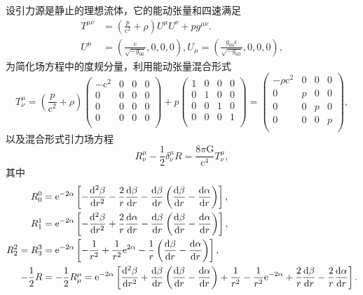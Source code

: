 \documentclass[11pt, a4paper, oneside, onecolumn]{ctexart}
\numberwithin{equation}{subsection}
\begin{document}
设引力源是静止的理想流体，它的能动张量和四速满足
\begin{align}
T^{\mu\nu}&=\left(\frac{p}{\mathrm{c}^{2}}+\rho\right)U^{\mu}U^{\nu}+pg^{\mu\nu}.\\
U^{\mu}&=\left(\frac{\mathrm{c}}{\sqrt{-g_{00}}},0,0,0\right),U_{\mu}=\left(\frac{g_{00}\mathrm{c}}{\sqrt{-g_{00}}},0,0,0\right),
\end{align}
为简化场方程中的度规分量，利用能动张量混合形式
\begin{equation}
T^{\mu}_{\nu}=\left(\frac{p}{\mathrm{c}^{2}}+\rho\right)
\begin{pmatrix}
-\mathrm{c}^{2} & 0 & 0 & 0\\
0 & 0 & 0 & 0\\
0 & 0 & 0 & 0\\
0 & 0 & 0 & 0\\
\end{pmatrix}
+p\begin{pmatrix}
1 & 0 & 0 & 0\\
0 & 1 & 0 & 0\\
0 & 0 & 1 & 0\\
0 & 0 & 0 & 1\\
\end{pmatrix}
=\begin{pmatrix}
-\rho \mathrm{c}^{2} & 0 & 0 & 0\\
0 & p & 0 & 0\\
0 & 0 & p & 0\\
0 & 0 & 0 & p\\
\end{pmatrix},
\end{equation}
以及混合形式引力场方程
\begin{equation}
R^{\mu}_{\nu}-\frac{1}{2}\delta{}^{\mu}_{\nu}R=\frac{8\pi\mathrm{G}}{\mathrm{c}^{4}}T^{\mu}_{\nu},
\end{equation}
其中
\begin{align}
R^{0}_{0}&=\mathrm{e}^{-2\alpha}\left[-\frac{\mathrm{d}^{2}\beta}{\mathrm{d}r^{2}}-\frac{2}{r}\frac{\mathrm{d}\beta}{\mathrm{d}r}-\frac{\mathrm{d}\beta}{\mathrm{d}r}\left(\frac{\mathrm{d}\beta}{\mathrm{d}r}-\frac{\mathrm{d}\alpha}{\mathrm{d}r}\right)\right],\notag\\
R^{1}_{1}&=\mathrm{e}^{-2\alpha}\left[-\frac{\mathrm{d}^{2}\beta}{\mathrm{d}r^{2}}+\frac{2}{r}\frac{\mathrm{d}\alpha}{\mathrm{d}r}-\frac{\mathrm{d}\beta}{\mathrm{d}r}\left(\frac{\mathrm{d}\beta}{\mathrm{d}r}-\frac{\mathrm{d}\alpha}{\mathrm{d}r}\right)\right],\notag\\
R^{2}_{2}=R^{3}_{3}&=\mathrm{e}^{-2\alpha}\left[-\frac{1}{r^{2}}+\frac{1}{r^{2}}\mathrm{e}^{2\alpha}-\frac{1}{r}\left(\frac{\mathrm{d}\beta}{\mathrm{d}r}-\frac{\mathrm{d}\alpha}{\mathrm{d}r}\right)\right],\notag\\
-\frac{1}{2}R&=-\frac{1}{2}R^{\mu}_{\mu}=\mathrm{e}^{-2\alpha}\left[\frac{\mathrm{d}^{2}\beta}{\mathrm{d}r^{2}}+\frac{\mathrm{d}\beta}{\mathrm{d}r}\left(\frac{\mathrm{d}\beta}{\mathrm{d}r}-\frac{\mathrm{d}\alpha}{\mathrm{d}r}\right)+\frac{1}{r^{2}}-\frac{1}{r^{2}}\mathrm{e}^{-2\alpha}+\frac{2}{r}\frac{\mathrm{d}\beta}{\mathrm{d}r}-\frac{2}{r}\frac{\mathrm{d}\alpha}{\mathrm{d}r}\right].\notag
\end{align}
\end{document}
